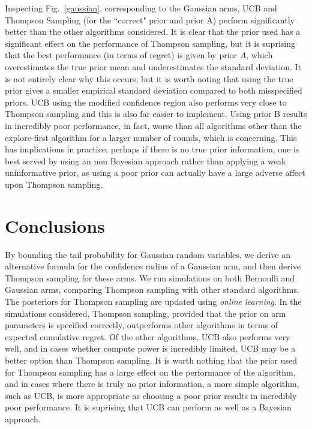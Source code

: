\documentclass[a4paper]{article}
\begin{document}
	Inspecting Fig.~\ref{gaussian}, corresponding to the Gaussian arms, UCB and Thompson Sampling (for the ``correct" prior and prior A) perform significantly better than the other algorithms considered. It is clear that the prior used has a significant effect on the performance of Thompson sampling, but it is suprising that the best performance (in terms of regret) is given by prior $A$, which overestimates the true prior mean and underestimates the standard deviation. It is not entirely clear why this occurs, but it is worth noting that using the true prior gives a smaller empirical standard deviation compared to both misspecified priors. UCB using the modified confidence region also performs very close to Thompson sampling and this is also far easier to implement. Using prior B results in incredibly poor performance, in fact, worse than all algorithms other than the explore-first algorithm for a larger number of rounds, which is concerning. This has implications in practice; perhaps if there is no true prior information, one is best served by using an non Bayesian approach rather than applying a weak uninformative prior, as using a poor prior can actually have a large adverse affect upon Thompson sampling. 
	
	\section{Conclusions}

	By bounding the tail probability for Gaussian random variables, we derive an alternative formula for the confidence radius of a Gaussian arm, and then derive Thompson sampling for these arms. We run simulations on both Bernoulli and Gaussian arms, comparing Thompson sampling with other standard algorithms. The posteriors for Thompson sampling are updated using \emph{online learning}. In the simulations considered, Thompson sampling, provided that the prior on arm parameters is specified correctly, outperforms other algorithms in terms of expected cumulative regret. Of the other algorithms, UCB also performs very well, and in cases whether compute power is incredibly limited, UCB may be a better option than Thompson sampling. It is worth nothing that the prior used for Thompson sampling has a large effect on the performance of the algorithm, and in cases where there is truly no prior information, a more simple algorithm, such as UCB, is more appropriate as choosing a poor prior results in incredibly poor performance. It is suprising that UCB can perform as well as a Bayesian approach. 
	
\end{document}
